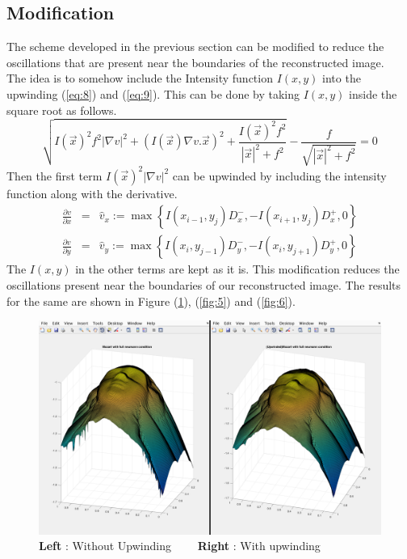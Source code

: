 \documentclass[11pt]{report}
\begin{document}
	\noindent
	\subsection{Modification}
	The scheme developed in the previous section can be modified to reduce the oscillations that are present near the boundaries of the reconstructed image. \\
	
	\noindent 
	The idea is to somehow include the Intensity function $I(x,y)$ into the upwinding (\ref{eq:8}) and (\ref{eq:9}). This can be done by taking $I(x,y)$ inside the square root as follows.
	\begin{equation}
		\sqrt{I(\vec{x})^2f^2|\nabla v|^2 + (I(\vec{x})\nabla v. \vec{x})^2 + \frac{I(\vec{x})^2f^2}{|\vec{x}|^2+f^2}} - \frac{f}{\sqrt{|\vec{x}|^2+f^2}} = 0\label{eq:12}
	\end{equation}
	Then the first term $I(\vec{x})^2|\nabla v|^2$ can be upwinded by including the intensity function along with the derivative. 
	\begin{eqnarray}
	\frac{\partial v }{\partial x} &=& \hat{v}_x := \max \left\{ I(x_{i-1},y_j)D_x^-,-I(x_{i+1},y_j)D_x^+,0  \right\}\label{eq:13} \\
	\frac{\partial v }{\partial y} &=& \hat{v}_y := \max \left\{ I(x_i,y_{j-1})D_y^-,-I(x_i,y_{j+1})D_y^+,0  \right\} \label{eq:14}
	\end{eqnarray}
	The $I(x,y)$ in the other terms are kept as it is. This modification reduces the oscillations present near the boundaries of our reconstructed image. The results for the same are shown in Figure (\ref{fig:4}), (\ref{fig:5}) and (\ref{fig:6}).\\
	
	
	\begin{figure}
		\centering
		\includegraphics[width = 14cm, height = 7cm]{Compare.png}
		\caption{\textbf{Left} : Without Upwinding  $\;\;\;\;\;\;$ \textbf{Right} : With upwinding}
		\label{fig:4}
	\end{figure}
	 
\end{document}
